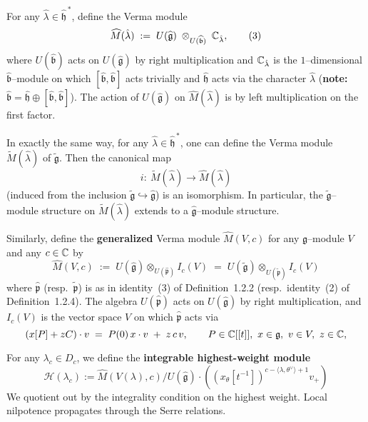 \documentclass[12pt]{article}
\begin{document}
\begin{definition}
    For any $\hat\lambda\in\widehat{\mathfrak h}^{\,*}$, define the Verma module
    \begin{equation}
        \widehat M(\hat\lambda)\;:=\;U(\widehat{\mathfrak g})\;\otimes_{U(\widehat{\mathfrak b})}\;\mathbb{C}_{\hat\lambda},
        \tag{3}
    \end{equation}
    where $U(\widehat{\mathfrak b})$ acts on $U(\widehat{\mathfrak g})$ by right multiplication and
    $\mathbb{C}_{\hat\lambda}$ is the $1$–dimensional $\widehat{\mathfrak b}$–module on which
    $[\widehat{\mathfrak b},\widehat{\mathfrak b}]$ acts trivially and
    $\widehat{\mathfrak h}$ acts via the character $\hat\lambda$
    (\textbf{note:} $\widehat{\mathfrak b}=\widehat{\mathfrak h}\oplus[\widehat{\mathfrak b},\widehat{\mathfrak b}]$).
    The action of $U(\widehat{\mathfrak g})$ on $\widehat M(\hat\lambda)$ is by left multiplication on the first factor.

    In exactly the same way, for any $\hat\lambda\in\widehat{\mathfrak h}^{\,*}$, one can define the
    Verma module $\widetilde M(\hat\lambda)$ of $\widetilde{\mathfrak g}$. Then the canonical map
    \[
        i:\ \widetilde M(\hat\lambda)\longrightarrow \widehat M(\hat\lambda)
    \]
    (induced from the inclusion $\widetilde{\mathfrak g}\hookrightarrow \widehat{\mathfrak g}$) is an isomorphism.
    In particular, the $\widetilde{\mathfrak g}$–module structure on $\widetilde M(\hat\lambda)$ extends to a
    $\widehat{\mathfrak g}$–module structure.

    Similarly, define the \textbf{generalized} Verma module $\widehat M(V,c)$ for any $\mathfrak g$–module $V$
    and any $c\in\mathbb{C}$ by
    \begin{equation}
        \widehat M(V,c)\;:=\;U(\widehat{\mathfrak g})\otimes_{U(\widehat{\mathfrak p})} I_c(V)
        \;=\; U(\widetilde{\mathfrak g})\otimes_{U(\widetilde{\mathfrak p})} I_c(V)
        \tag{g.v.m}
    \end{equation}
    where $\widehat{\mathfrak p}$ (resp.\ $\widetilde{\mathfrak p}$) is as in identity~(3) of
    Definition~1.2.2 (resp.\ identity~(2) of Definition~1.2.4). The algebra
    $U(\widehat{\mathfrak p})$ acts on $U(\widehat{\mathfrak g})$ by right multiplication, and
    $I_c(V)$ is the vector space $V$ on which $\widehat{\mathfrak p}$ acts via
    \[
        (x[P]+zC)\cdot v \;=\; P(0)\,x\cdot v \;+\; z\,c\,v,
        \qquad P\in\C[[t]],\ x\in\mathfrak g,\ v\in V,\ z\in\C,
    \]

    For any $\lambda_c \in D_c$, we define the \textbf{integrable highest-weight module}
    \begin{equation}
        \mathcal{H}(\lambda_c) := \widehat M(V(\lambda), c) / U(\widehat{\mathfrak g})\cdot ((x_\theta[t^{-1}])^{c - \langle \lambda, \theta^\vee \rangle + 1} v_+)
        \tag{i.h.w.m}
    \end{equation}
    We quotient out by the integrality condition on the highest weight. Local nilpotence propagates through the Serre relations.
\end{definition}
\end{document}
